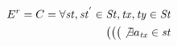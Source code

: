 \documentclass{sig-alternate-05-2015}
\begin{document}
  \begin{align}\label{eqn:PL299}
\begin{split}
E^{r} = C = \forall \mathit{st}, \mathit{st}^{'} \in \mathit{St}, \mathit{tx}, \mathit{ty} \in \mathit{St} \\ \big(
 \big( \big( \not\exists a_\mathit{tx} \in \mathit{st}

\end{split}
\end{align}
\end{document}
